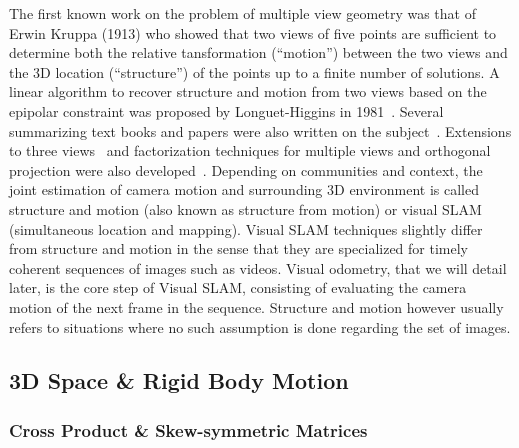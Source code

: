 The first known work on the problem of multiple view geometry was that of
Erwin Kruppa (1913) who showed that two views of five points
are sufficient to determine both the relative tansformation
(``motion'') between the two views and the 3D location (``structure'')
of the points up to a finite number of solutions.
A linear algorithm to recover structure and motion from two views based
on the epipolar constraint was proposed by Longuet-Higgins in 1981~\cite{longuet1981computer}.
Several summarizing text books and papers were also written
on the subject~\cite{faugeras1993three, weng1993optimal}.
Extensions to three views~\cite{spetsakis1987closed, shashua1994trilinearity}
and factorization techniques for multiple views and orthogonal projection were
also developed~\cite{tomasi1992shape}.
Depending on communities and context,
the joint estimation of camera motion and surrounding 3D environment is called
structure and motion (also known as structure from motion)
or visual SLAM (simultaneous location and mapping).
Visual SLAM techniques slightly differ from structure and motion in the sense
that they are specialized for timely coherent sequences of images such as videos.
Visual odometry, that we will detail later, is the core step of Visual SLAM,
consisting of evaluating the camera motion of the next frame in the sequence.
Structure and motion however usually refers to situations where no such assumption
is done regarding the set of images.

\subsection{3D Space \& Rigid Body Motion}%
\label{sub:3d_space_rigid_body_motion}

%


\subsubsection{Cross Product \& Skew-symmetric Matrices}%
\label{ssub:cross_product_and_skew_symmetric_matrices}

